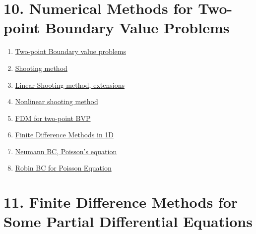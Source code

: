 \documentclass[11pt]{article}
\begin{document}
\newpage 

\section*{10. Numerical Methods for Two-point Boundary Value Problems}

\vspace{-0.5cm}

\begin{multicols}{2}
	\begin{enumerate}
		\item \href{https://mp.weixin.qq.com/s/rQJCn_4LOho9bQBjVE11LQ}{Two-point Boundary value problems}	%
		\item \href{https://mp.weixin.qq.com/s/m6VF2jXMJzcBlwPA1PdHIA}{Shooting method}	%
		\item \href{https://mp.weixin.qq.com/s/Pv47HQkofQ71zdduYCYbTw}{Linear Shooting method, extensions}	%
		\item \href{https://mp.weixin.qq.com/s/8-vQbUMZCYjAAiiECNfzXw}{Nonlinear shooting method}	%
		\item \href{https://mp.weixin.qq.com/s/CNcZPxMqd_Si46o8aDoZdw}{FDM for two-point BVP}	%
		\item \href{https://mp.weixin.qq.com/s/0jHm4X9vRXTRN7CzLtzRGg}{Finite Difference Methods in 1D}	%
		\item \href{https://mp.weixin.qq.com/s/suoWOEbjIqgXuloTSAzNIA}{Neumann BC, Poisson's equation}	%
		\item \href{https://mp.weixin.qq.com/s/gPpcQKQ2EYzQUNqIpouq4A}{Robin BC for Poisson Equation}	%
	\end{enumerate}
\end{multicols}

\vspace{-1cm}

\section*{11. Finite Difference Methods for Some Partial Differential Equations}

\vspace{-0.5cm}
\end{document}
